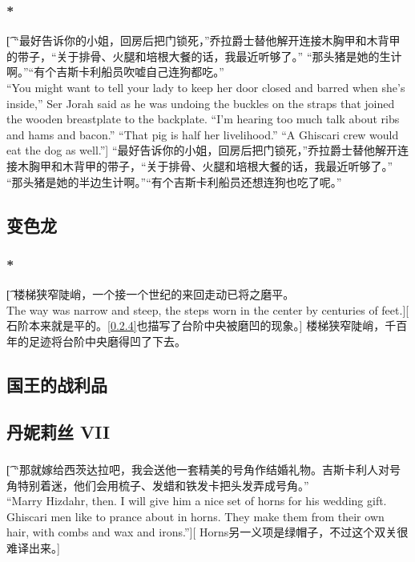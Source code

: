 \documentclass[12pt,a4paper]{article}
\begin{document}
\subsubsection{\color{red}*}\t[
	“最好告诉你的小姐，回房后把门锁死，”乔拉爵士替他解开连接木胸甲和木背甲的带子，“关于排骨、火腿和培根大餐的话，我最近听够了。” “那头猪是她的生计啊。”“有个吉斯卡利船员吹嘘自己连狗都吃。”\\
	“You might want to tell your lady to keep her door closed and barred when she's inside,” Ser Jorah said as he was undoing the buckles on the straps that joined the wooden breastplate to the backplate. “I'm hearing too much talk about ribs and hams and bacon.” “That pig is half her livelihood.” “A Ghiscari crew would eat the dog as well.”]
	“最好告诉你的小姐，回房后把门锁死，”乔拉爵士替他解开连接木胸甲和木背甲的带子，“关于排骨、火腿和培根大餐的话，我最近听够了。” “那头猪是她的半边生计啊。”“有个吉斯卡利船员还想连狗也吃了呢。”
	

\subsection{变色龙}
\subsubsection{\color{red}*}\t[
	楼梯狭窄陡峭，一个接一个世纪的来回走动已将之磨平。\\
	The way was narrow and steep, the steps worn in the center by centuries of feet.][
	石阶本来就是平的。\ref{0.2.4}也描写了台阶中央被磨凹的现象。]
	楼梯狭窄陡峭，千百年的足迹将台阶中央磨得凹了下去。
	
\subsection{国王的战利品}

\subsection{丹妮莉丝 VII}
\subsubsection{}\t[
	“那就嫁给西茨达拉吧，我会送他一套精美的号角作结婚礼物。吉斯卡利人对号角特别着迷，他们会用梳子、发蜡和铁发卡把头发弄成号角。”\\
	“Marry Hizdahr, then. I will give him a nice set of horns for his wedding gift. Ghiscari men like to prance about in horns. They make them from their own hair, with combs and wax and irons.”][
	Horns另一义项是绿帽子，不过这个双关很难译出来。]
	
\end{document}
